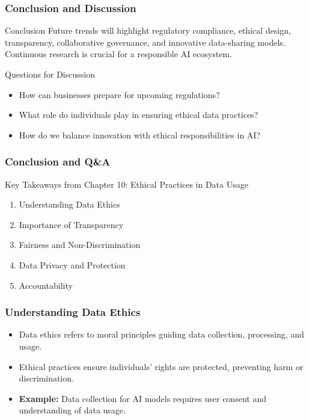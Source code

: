 \documentclass[aspectratio=169]{beamer}
\begin{document}
\begin{frame}[fragile]
    \frametitle{Conclusion and Discussion}
    \begin{block}{Conclusion}
        Future trends will highlight regulatory compliance, ethical design, transparency, collaborative governance, and innovative data-sharing models. Continuous research is crucial for a responsible AI ecosystem.
    \end{block}
    \begin{block}{Questions for Discussion}
        \begin{itemize}
            \item How can businesses prepare for upcoming regulations?
            \item What role do individuals play in ensuring ethical data practices? 
            \item How do we balance innovation with ethical responsibilities in AI?
        \end{itemize}
    \end{block}
\end{frame}

\begin{frame}[fragile]
    \frametitle{Conclusion and Q\&A}
    \begin{block}{Key Takeaways from Chapter 10: Ethical Practices in Data Usage}
        \begin{enumerate}
            \item Understanding Data Ethics
            \item Importance of Transparency
            \item Fairness and Non-Discrimination
            \item Data Privacy and Protection
            \item Accountability
        \end{enumerate}
    \end{block}
\end{frame}

\begin{frame}[fragile]
    \frametitle{Understanding Data Ethics}
    \begin{itemize}
        \item Data ethics refers to moral principles guiding data collection, processing, and usage.
        \item Ethical practices ensure individuals' rights are protected, preventing harm or discrimination.
        \item {\bf Example:} Data collection for AI models requires user consent and understanding of data usage.
    \end{itemize}
\end{frame}
\end{document}
